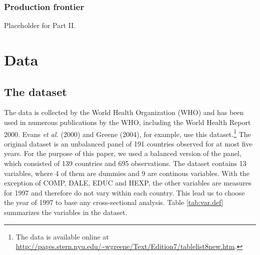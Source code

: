 \documentclass[12pt,a4paper]{article}\usepackage[]{graphicx}\usepackage[]{color}
\begin{document}
\subsubsection{Production frontier}
Placeholder for Part II.


% 
\section{Data}




\subsection{The dataset}
The data is collected by the World Health Organization (WHO) and has been used in numerous publications by the WHO, including the World Health Report 2000. Evans \textit{et al.} (2000) and Greene (2004), for example, use this dataset.\footnote{The data is available online at \\ \url{http://pages.stern.nyu.edu/~wgreene/Text/Edition7/tablelist8new.htm}.} The original dataset is an unbalanced panel of 191 countries observed for at most five years. For the purpose of this paper, we used a balanced version of the panel, which consisted of 139 countries and 695 observations. The dataset contains 13 variables, where 4 of them are dummies and 9 are continous variables. With the exception of COMP, DALE, EDUC and HEXP, the other variables are measures for 1997 and therefore do not vary within each country. This lead us to choose the year of 1997 to base any cross-sectional analysis. Table \ref{tab:var.def} summarizes the variables in the dataset.
\end{document}
